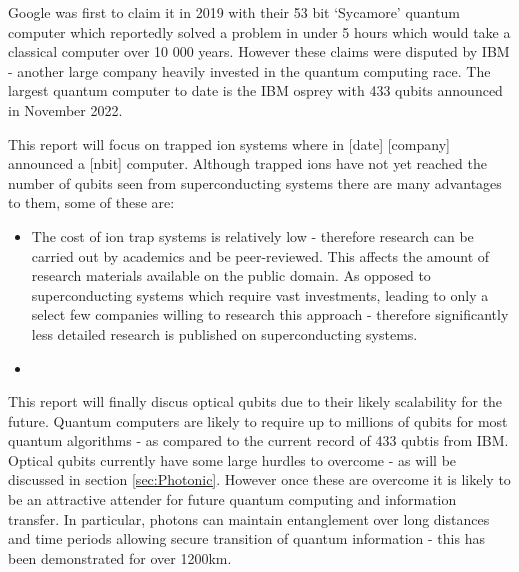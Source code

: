 Google was first to claim it in 2019 with their 53 bit `Sycamore' quantum computer which reportedly solved a problem in under 5 hours which would take a classical computer over 10 000 years. \cite{gibney_hello_2019} 
However these claims were disputed by IBM - another large company heavily invested in the quantum computing race.
The largest quantum computer to date is the IBM osprey with 433 qubits announced in November 2022.
\vspac{1em}

This report will focus on trapped ion systems where in [date] [company] announced a [nbit] computer. Although trapped ions have not yet reached the number of qubits seen from superconducting systems there are many advantages to them, some of these are: 
\begin{itemize}
    \item The cost of ion trap systems is relatively low - therefore research can be carried out by academics and be peer-reviewed. This affects the amount of research materials available on the public domain. As opposed to superconducting systems which require vast investments, leading to only a select few companies willing to research this approach - therefore significantly less detailed research is published on superconducting systems. 
    \item 
\end{itemize}

This report will finally discus optical qubits due to their likely scalability for the future. 
Quantum computers are likely to require up to millions of qubits for most quantum algorithms - as compared to the current record of 433 qubtis from IBM. \cite{bergou_quantum_2021} 
Optical qubits currently have some large hurdles to overcome - as will be discussed in section \ref{sec:Photonic}. However once these are overcome it is likely to be an attractive attender for future quantum computing and information transfer.
In particular, photons can maintain entanglement over long distances and time periods allowing secure transition of quantum information - this has been demonstrated for over 1200km. \cite{yin_satellite-based_2017}